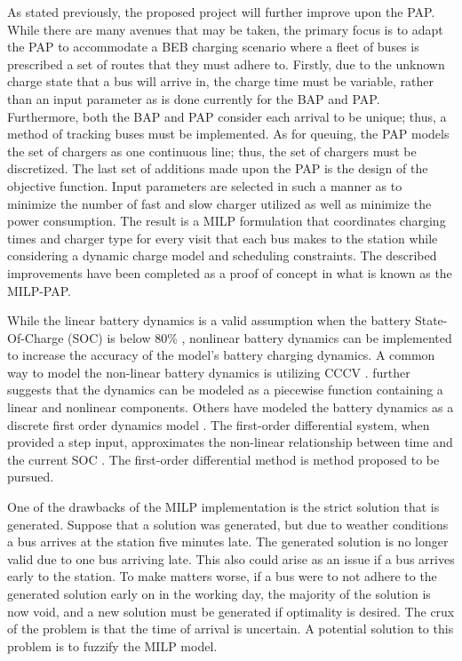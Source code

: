 \documentclass[11pt,a4paper,final]{article}
\begin{document}
As stated previously, the proposed project will further improve upon the PAP. While there are many avenues that may be
taken, the primary focus is to adapt the PAP to accommodate a BEB charging scenario where a fleet of buses is prescribed
a set of routes that they must adhere to. Firstly, due to the unknown charge state that a bus will arrive in, the charge
time must be variable, rather than an input parameter as is done currently for the BAP and PAP. Furthermore, both the
BAP and PAP consider each arrival to be unique; thus, a method of tracking buses must be implemented. As for queuing,
the PAP models the set of chargers as one continuous line; thus, the set of chargers must be discretized. The last set
of additions made upon the PAP is the design of the objective function. Input parameters are selected in such a manner
as to minimize the number of fast and slow charger utilized as well as minimize the power consumption. The result is a
MILP formulation that coordinates charging times and charger type for every visit that each bus makes to the station
while considering a dynamic charge model and scheduling constraints. The described improvements have been completed as a
proof of concept in what is known as the MILP-PAP.

While the linear battery dynamics is a valid assumption when the battery State-Of-Charge (SOC) is below 80\%
\cite{liu-2020-batter-elect}, nonlinear battery dynamics can be implemented to increase the accuracy of the model's
battery charging dynamics. A common way to model the non-linear battery dynamics is utilizing CCCV
\cite{abdollahi-2016-optim-batter,chen-2008-desig-grey}. \cite{zhang-2021-optim-elect} further suggests that the
dynamics can be modeled as a piecewise function containing a linear and nonlinear components. Others have modeled the
battery dynamics as a discrete first order dynamics model \cite{whitaker-2022-a-network}. The first-order differential
system, when provided a step input, approximates the non-linear relationship between time and the current SOC
\cite{whitaker-2022-a-network}. The first-order differential method is method proposed to be pursued.

One of the drawbacks of the MILP implementation is the strict solution that is generated. Suppose that a solution was
generated, but due to weather conditions a bus arrives at the station five minutes late. The generated solution is no
longer valid due to one bus arriving late. This also could arise as an issue if a bus arrives early to the station. To
make matters worse, if a bus were to not adhere to the generated solution early on in the working day, the majority of
the solution is now void, and a new solution must be generated if optimality is desired. The crux of the problem is that
the time of arrival is uncertain. A potential solution to this problem is to fuzzify the MILP model.
\end{document}
